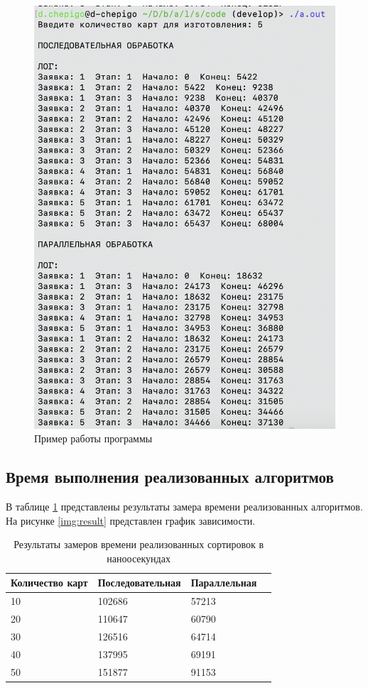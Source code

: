 \begin{figure}[!h]
	\centering
	\includegraphics[width=130mm]{images/example}
	\caption{Пример работы программы}
	\label{img:example}
\end{figure}

\pagebreak
\newpage
\subsection{Время выполнения реализованных алгоритмов}
В таблице \ref{tab:time} представлены результаты замера времени реализованных алгоритмов. На рисунке \ref{img:result} представлен график зависимости.
\begin{table}[hbtp]
	\begin{center}
		\begin{flushleft}
			\caption{\label{tab:time}Результаты замеров времени реализованных сортировок в наноосекундах}
		\end{flushleft}
		\begin{tabular}{|l | l | l | l |} 
		\hline {Количество карт} & {Последовательная} & {Параллельная} \\ \hline
		10 & 102686 & 57213   \\ \hline
		20 & 110647   &  60790 \\ \hline
		30 & 126516 & 64714   \\ \hline
		40 &  137995 &  69191 \\ \hline
		50 & 151877 & 91153\\ \hline
		\end{tabular}
	\end{center}
\end{table}

